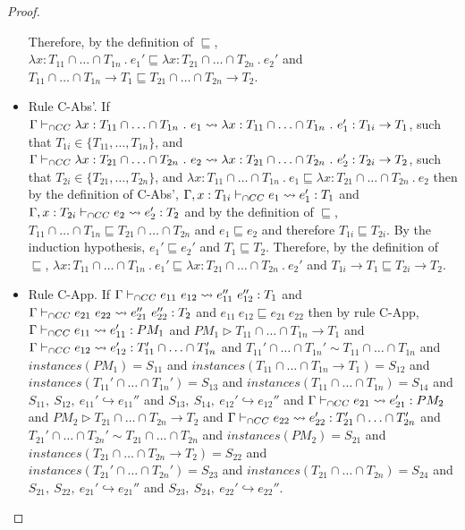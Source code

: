 \documentclass[a4paper]{article}
\begin{document}
\begin{proof}
\begin{itemize}
    Therefore, by the definition of $\sqsubseteq$, $\lambda x : T_{11} \cap \ldots \cap T_{1n}\ .\ e_1' \sqsubseteq \lambda x : T_{21} \cap \ldots \cap T_{2n}\ .\ e_2'$ and $T_{11} \cap \ldots \cap T_{1n} \rightarrow T_1 \sqsubseteq T_{21} \cap \ldots \cap T_{2n} \rightarrow T_2$.
    \item Rule C-Abs'.
    If $\Gamma \vdash_{\cap CC} \lambda x : T_{11} \cap \ldots \cap T_{1n}\ .\ e_1 \leadsto \lambda x : T_{11} \cap \ldots \cap T_{1n}\ .\ e_1': T_{1i} \rightarrow T_1$, such that $T_{1i} \in \{T_{11}, \ldots, T_{1n}\}$, and $\Gamma \vdash_{\cap CC} \lambda x : T_{21} \cap \ldots \cap T_{2n}\ .\ e_2 \leadsto \lambda x : T_{21} \cap \ldots \cap T_{2n}\ .\ e_2' : T_{2i} \rightarrow T_2$, such that $T_{2i} \in \{T_{21}, \ldots, T_{2n}\}$, and $\lambda x : T_{11} \cap \ldots \cap T_{1n}\ .\ e_1 \sqsubseteq \lambda x : T_{21} \cap \ldots \cap T_{2n}\ .\ e_2$ then by the definition of C-Abs', $\Gamma, x : T_{1i} \vdash_{\cap CC} e_1 \leadsto e_1': T_1$ and $\Gamma, x : T_{2i} \vdash_{\cap CC} e_2 \leadsto e_2': T_2$ and by the definition of $\sqsubseteq$, $T_{11} \cap \ldots \cap T_{1n} \sqsubseteq T_{21} \cap \ldots \cap T_{2n}$ and $e_1 \sqsubseteq e_2$ and therefore $T_{1i} \sqsubseteq T_{2i}$.
    By the induction hypothesis, $e_1' \sqsubseteq e_2'$ and $T_1 \sqsubseteq T_2$.
    Therefore, by the definition of $\sqsubseteq$, $\lambda x : T_{11} \cap \ldots \cap T_{1n}\ .\ e_1' \sqsubseteq \lambda x : T_{21} \cap \ldots \cap T_{2n}\ .\ e_2'$ and $T_{1i} \rightarrow T_1 \sqsubseteq T_{2i} \rightarrow T_2$.
    \item Rule C-App.
    If $\Gamma \iccts e_{11}\ e_{12} \leadsto e_{11}''\ e_{12}'' : T_1$ and $\Gamma \iccts e_{21}\ e_{22} \leadsto e_{21}''\ e_{22}'' : T_2$ and $e_{11}\ e_{12} \sqsubseteq e_{21}\ e_{22}$ then by rule C-App, $\Gamma \vdash_{\cap CC} e_{11} \leadsto e_{11}' : PM_1$ and $PM_1 \rhd T_{11} \cap \ldots \cap T_{1n} \rightarrow T_1$ and $\Gamma \vdash_{\cap CC} e_{12} \leadsto e_{12}' : T_{11}' \cap \ldots \cap T_{1n}'$ and $T_{11}' \cap \ldots \cap T_{1n}' \sim T_{11} \cap \ldots \cap T_{1n}$ and $instances(PM_1) = S_{11}$ and $instances(T_{11} \cap \ldots \cap T_{1n} \rightarrow T_1) = S_{12}$ and $instances(T_{11}' \cap \ldots \cap T_{1n}') = S_{13}$ and $instances(T_{11} \cap \ldots \cap T_{1n}) = S_{14}$ and $S_{11},\ S_{12},\ e_{11}' \hookrightarrow e_{11}''$ and $S_{13},\ S_{14},\ e_{12}' \hookrightarrow e_{12}''$ and $\Gamma \vdash_{\cap CC} e_{21} \leadsto e_{21}' : PM_2$ and $PM_2 \rhd T_{21} \cap \ldots \cap T_{2n} \rightarrow T_2$ and $\Gamma \vdash_{\cap CC} e_{22} \leadsto e_{22}' : T_{21}' \cap \ldots \cap T_{2n}'$ and $T_{21}' \cap \ldots \cap T_{2n}' \sim T_{21} \cap \ldots \cap T_{2n}$ and $instances(PM_2) = S_{21}$ and $instances(T_{21} \cap \ldots \cap T_{2n} \rightarrow T_2) = S_{22}$ and $instances(T_{21}' \cap \ldots \cap T_{2n}') = S_{23}$ and $instances(T_{21} \cap \ldots \cap T_{2n}) = S_{24}$ and $S_{21},\ S_{22},\ e_{21}' \hookrightarrow e_{21}''$ and $S_{23},\ S_{24},\ e_{22}' \hookrightarrow e_{22}''$.

\end{itemize}
\end{proof}
\end{document}
